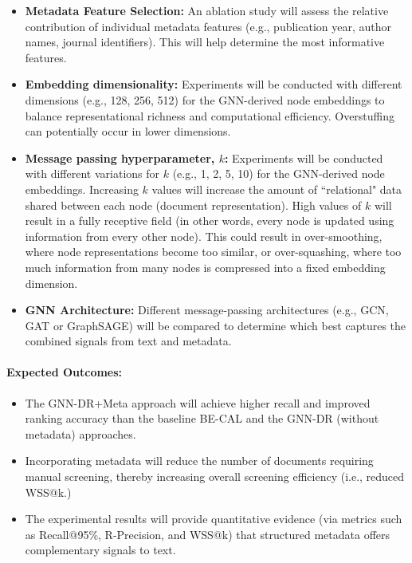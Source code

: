 \documentclass[10pt,oneside]{book}
\begin{document}
\begin{itemize} \item \textbf{Metadata Feature Selection:}
An ablation study will assess the relative contribution of individual metadata features (e.g., publication year, author names, journal identifiers). This will help determine the most informative features.

\item \textbf{Embedding dimensionality:}
Experiments will be conducted with different dimensions (e.g., 128, 256, 512) for the GNN-derived node embeddings to balance representational richness and computational efficiency. Overstuffing can potentially occur in lower dimensions.

\item \textbf{Message passing hyperparameter, $k$:}
Experiments will be conducted with different variations for $k$ (e.g., 1, 2, 5, 10) for the GNN-derived node embeddings. Increasing $k$ values will increase the amount of ``relational" data shared between each node (document representation). High values of $k$ will result in a fully receptive field (in other words, every node is updated using information from every other node). This could result in over-smoothing, where node representations become too similar, or over-squashing, where too much information from many nodes is compressed into a fixed embedding dimension. 


\item \textbf{GNN Architecture:}
Different message-passing architectures (e.g., GCN, GAT or GraphSAGE) will be compared to determine which best captures the combined signals from text and metadata. \end{itemize}

\paragraph{Expected Outcomes:}


\begin{itemize} 
\item The GNN-DR+Meta approach will achieve higher recall and improved ranking accuracy than the baseline BE-CAL and the GNN-DR (without metadata) approaches. 
\item Incorporating metadata will reduce the number of documents requiring manual screening, thereby increasing overall screening efficiency (i.e., reduced WSS@k.)
\item The experimental results will provide quantitative evidence (via metrics such as Recall@95\%, R-Precision, and WSS@k) that structured metadata offers complementary signals to text. 
\end{itemize}
\end{document}
